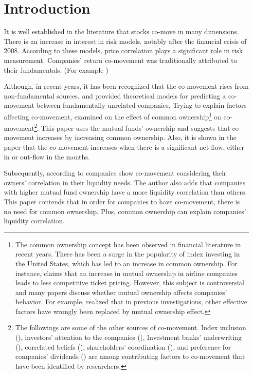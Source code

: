 \section{Introduction}

It is well established in the literature that stocks co-move in many dimensions. There is an increase in interest in risk models, notably after the financial crisis of 2008. According to these models, price correlation plays a significant role in risk measurement. Companies' return co-movement was traditionally attributed to their fundamentals. (For example {\cite{shiller1989comovements}})
	
	Although, in recent years, it has been recognized that the co-movement rises from non-fundamental sources. {\cite{barberis2003style} and \cite{barberis2005comovement}} provided theoretical models for predicting a co-movement between fundamentally unrelated companies. Trying to explain factors affecting co-movement, {\cite{AntonPolk}} examined on the effect of common ownership\footnote{The common ownership concept has been observed in financial literature in recent years. There has been a surge in the popularity of index investing in the United States, which has led to an increase in common ownership. 
			For instance, \cite{azar2018anticompetitive} claims that an increase in mutual ownership in airline companies leads to less competitive ticket pricing. However, this subject is controversial and many papers discuss whether mutual ownership affects companies' behavior.
			For example, \cite{lewellen2021does} realized that in previous investigations, other effective factors have wrongly been replaced by mutual ownership effect.
		} on co-movement\footnote{	The followings are some of the other sources of co-movement. Index inclusion ({\cite{barberis2005comovement}}), investors' attention to the companies ({\cite{wu2014investor}}), Investment banks' underwriting ({\cite{grullon2014comovement}}), correlated beliefs ({\cite{david2016correlated}}), shareholders' coordination ({\cite{pantzalis2017shareholder}}), and preference for companies' dividends ({\cite{HAMEED2019103}}) are among contributing factors to co-movement that have been identified by researchers.}.	This paper uses the mutual funds' ownership and suggests that co-movement increases by increasing common ownership. Also, it is shown in the paper that the  co-movement increases when there is a significant net flow, either in or out-flow in the months.
	
	Subsequently, according to {\cite{Liquidity2016}} companies show co-movement considering their owners' correlation in their liquidity needs. The author also adds that companies with higher mutual fund ownership have a more liquidity correlation than others. This paper contends that in order for companies to have co-movement, there is no need for common ownership. Plus, common ownership can explain companies'  liquidity correlation. 
	
